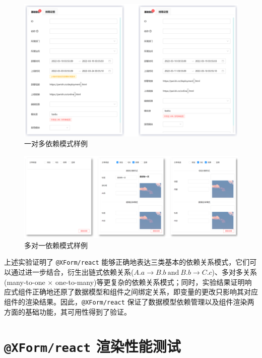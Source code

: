 \documentclass[winfonts,master,twoside]{njuthesis}
\makeatletter
\newcommand{\xform}[1]{\texttt{@XForm/#1}}
\makeatother
\begin{document}
\begin{figure}[h]
    \centering
    \includegraphics[width=\textwidth]{figure/chapter-5/one-to-many-dependency-update.png}
    \caption{一对多依赖模式样例}
    \label{one-to-many-dependency-figure}
\end{figure}

\begin{figure}[h]
    \centering
    \includegraphics[width=\textwidth]{figure/chapter-5/many-to-one-dependency-update.png}
    \caption{多对一依赖模式样例}
    \label{many-to-one-dependency-figure}
\end{figure}

上述实验证明了 \xform{react} 能够正确地表达三类基本的依赖关系模式，它们可以通过进一步结合，衍生出链式依赖关系($A.a \rightarrow B.b\ \text{and}\ B.b \rightarrow C.c$)、多对多关系(many-to-one $\times$ one-to-many)等更复杂的依赖关系模式；同时，实验结果证明响应式组件正确地还原了数据模型和组件之间绑定关系，即变量的更改只影响其对应组件的渲染结果。因此，\xform{react} 保证了数据模型依赖管理以及组件渲染两方面的基础功能，其可用性得到了验证。

\section{\xform{react} 渲染性能测试}
\end{document}
